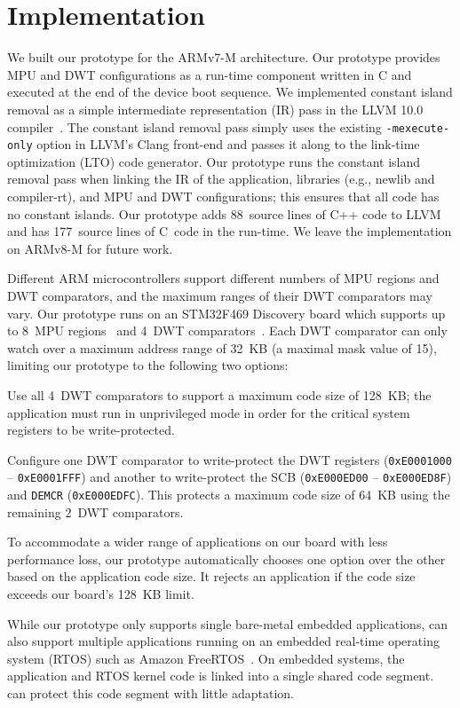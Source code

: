 \section{Implementation}
\label{sec:impl}

We built our {\System} prototype for the ARMv7-M architecture.  Our
prototype provides MPU and DWT configurations as a run-time component
written in C and executed at the end of the device boot sequence.
We implemented constant island removal as a
simple intermediate representation (IR) pass in the LLVM 10.0
compiler~\cite{LLVM:CGO04}.  The constant island removal pass
simply uses the existing {\tt -mexecute-only} option in
LLVM's Clang front-end and passes it along to the link-time optimization
(LTO) code generator.  Our prototype runs the constant island removal
pass when linking the IR of the application, libraries (e.g., newlib and
compiler-rt), and MPU and DWT configurations; this
ensures that all code has no constant islands.  Our prototype adds
88~source lines of C++ code to LLVM and has 177~source
lines of C~code in the {\System} run-time.  We leave the {\System}
implementation on ARMv8-M for future work.

Different ARM microcontrollers support different numbers of MPU
regions and DWT comparators, and the maximum ranges of their
DWT comparators may vary.
Our prototype runs on an STM32F469
Discovery board which supports up to 8~MPU
regions~\cite{STM32CortexM4:Manual} and 4~DWT
comparators~\cite{STM32F469I-DISCO:Manual}.  Each DWT
comparator can only watch over a maximum address range of 32~KB
(a maximal mask value of 15), limiting
our prototype to the following two options:

\begin{inparaenum}
\item
  Use all 4~DWT comparators to support a maximum code size of
  128~KB; the application must run in unprivileged mode in order
  for the critical system registers to be write-protected.

\item
  Configure one DWT comparator to write-protect the DWT registers
  ({\tt 0xE0001000} -- {\tt 0xE0001FFF}) and another to
  write-protect the SCB ({\tt 0xE000ED00} -- {\tt 0xE000ED8F}) and
  {\tt DEMCR} ({\tt 0xE000EDFC}). This protects a maximum code size
  of 64~KB using the remaining 2~DWT comparators.
\end{inparaenum}

To accommodate a wider range of applications on our board with less
performance loss, our prototype automatically chooses one option over
the other based on the application code size.  It rejects an application
if the code size exceeds our board's 128~KB limit.

While our {\System} prototype only supports single bare-metal
embedded applications, {\System} can also support multiple applications
running on an embedded real-time operating system (RTOS) such as Amazon
FreeRTOS~\cite{FreeRTOS:Amazon}.  On embedded systems, the application
and RTOS kernel code is linked into a single shared code
segment.  {\System} can protect this code segment with little adaptation.
